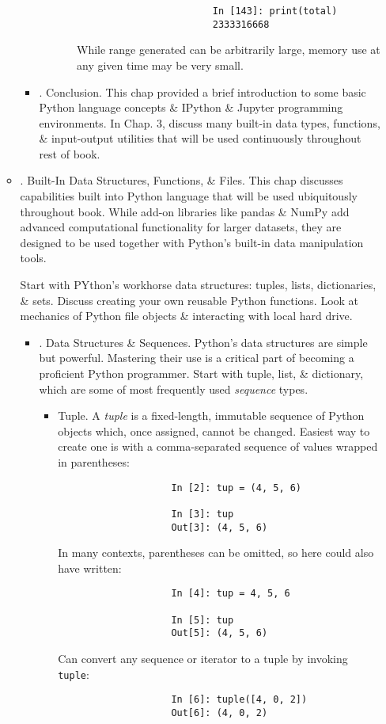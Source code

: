 \documentclass{article}
\begin{document}
\begin{enumerate}
\begin{itemize}
\begin{itemize}
\begin{itemize}
\begin{itemize}
\begin{verbatim}
						In [143]: print(total)
						2333316668
					\end{verbatim}
					While range generated can be arbitrarily large, memory use at any given time may be very small.
				\end{itemize}
			\end{itemize}
			\item {. Conclusion.} This chap provided a brief introduction to some basic Python language concepts \& IPython \& Jupyter programming environments. In Chap. 3, discuss many built-in data types, functions, \& input-output utilities that will be used continuously throughout rest of book.
		\end{itemize}
		\item {. Built-In Data Structures, Functions, \& Files.} This chap discusses capabilities built into Python language that will be used ubiquitously throughout book. While add-on libraries like pandas \& NumPy add advanced computational functionality for larger datasets, they are designed to be used together with Python's built-in data manipulation tools.
		
		Start with PYthon's workhorse data structures: tuples, lists, dictionaries, \& sets. Discuss creating your own reusable Python functions. Look at mechanics of Python file objects \& interacting with local hard drive.
		\begin{itemize}
			\item {. Data Structures \& Sequences.} Python's data structures are simple but powerful. Mastering their use is a critical part of becoming a proficient Python programmer. Start with tuple, list, \& dictionary, which are some of most frequently used {\it sequence} types.
			\begin{itemize}
				\item {\sf Tuple.} A {\it tuple} is a fixed-length, immutable sequence of Python objects which, once assigned, cannot be changed. Easiest way to create one is with a comma-separated sequence of values wrapped in parentheses:
				\begin{verbatim}
					In [2]: tup = (4, 5, 6)
					
					In [3]: tup
					Out[3]: (4, 5, 6)
				\end{verbatim}
				In many contexts, parentheses can be omitted, so here could also have written:
				\begin{verbatim}
					In [4]: tup = 4, 5, 6
					
					In [5]: tup
					Out[5]: (4, 5, 6)
				\end{verbatim}
				Can convert any sequence or iterator to a tuple by invoking {\tt tuple}:
				\begin{verbatim}
					In [6]: tuple([4, 0, 2])
					Out[6]: (4, 0, 2)
					

\end{verbatim}
\end{itemize}
\end{itemize}
\end{itemize}
\end{enumerate}
\end{document}
